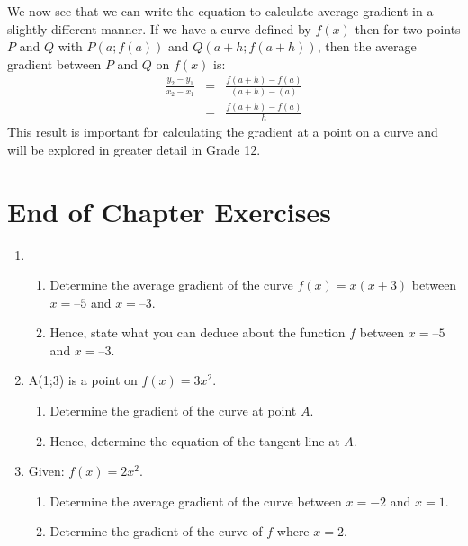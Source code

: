 We now see that we can write the equation to calculate average gradient in a slightly different manner. If we have a curve defined by $f(x)$ then for two points $P$ and $Q$ with $P(a;f(a))$ and $Q(a+h;f(a+h))$, then the average gradient between $P$ and $Q$ on $f(x)$ is:
\begin{eqnarray*}
\frac{y_2-y_1}{x_2-x_1}&=&\frac{f(a+h)-f(a)}{(a+h)-(a)}\\
&=&\frac{f(a+h)-f(a)}{h}
\end{eqnarray*}
This result is important for calculating the gradient at a point on a curve and will be explored in greater detail in Grade 12.

\section{End of Chapter Exercises}
\begin{enumerate}
\item{}
\begin{enumerate}
\item{Determine the average gradient of the curve $f(x) = x(x+3)$ between $x = 5$ and $x = 3$.}
\item{Hence, state what you can deduce about the function $f$ between $x = 5$ and $x = 3$.}
\end{enumerate}
\item{A(1;3) is a point on $f(x)=3x^2$.}{
\begin{enumerate}
\item{Determine the gradient of the curve at point $A$.}
\item{Hence, determine the equation of the tangent line at $A$.}
\end{enumerate}
}
\item{Given: $f(x)=2x^2$.}{
\begin{enumerate}
\item{Determine the average gradient of the curve between $x=-2$ and $x=1$.}
\item{Determine the gradient of the curve of $f$ where $x=2$.}
\end{enumerate}}
\end{enumerate}







